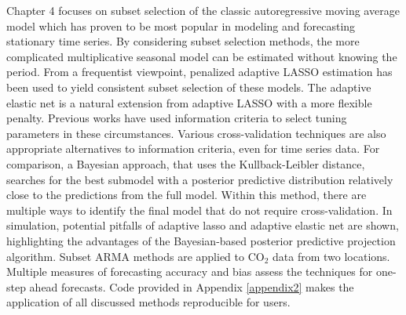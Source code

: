 Chapter 4 focuses on subset selection of the classic autoregressive moving average model which has proven to be most popular in modeling and forecasting stationary time series. By considering subset selection methods, the more complicated multiplicative seasonal model can be estimated without knowing the period. From a frequentist viewpoint, penalized adaptive LASSO estimation has been used to yield consistent subset selection of these models. The adaptive elastic net is a natural extension from adaptive LASSO with a more flexible penalty. Previous works have used information criteria to select tuning parameters in these circumstances. Various cross-validation techniques are also appropriate alternatives to information criteria, even for time series data. For comparison, a Bayesian approach, that uses the Kullback-Leibler distance, searches for the best submodel with a posterior predictive distribution relatively close to the predictions from the full model. Within this method, there are multiple ways to identify the final model that do not require cross-validation. In simulation, potential pitfalls of adaptive lasso and adaptive elastic net are shown, highlighting the advantages of the Bayesian-based posterior predictive projection algorithm. Subset ARMA methods are applied to $\textrm{CO}_2$ data from two locations. Multiple measures of forecasting accuracy and bias assess the techniques for one-step ahead forecasts. Code provided in Appendix \ref{appendix2} makes the application of all discussed methods reproducible for users.